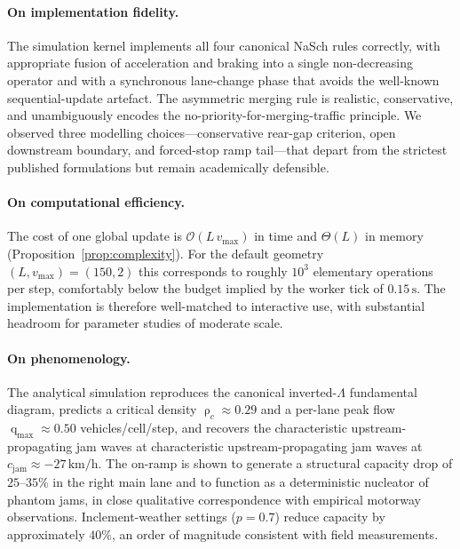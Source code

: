 \documentclass[11pt,a4paper]{article}
\DeclareMathOperator{\flow}{q}
\DeclareMathOperator{\dens}{\rho}
\begin{document}
\paragraph{On implementation fidelity.}
The simulation kernel implements all four canonical NaSch rules
correctly, with appropriate fusion of acceleration and braking into a
single non-decreasing operator and with a synchronous lane-change
phase that avoids the well-known sequential-update artefact. The
asymmetric merging rule is realistic, conservative, and unambiguously
encodes the no-priority-for-merging-traffic principle. We observed
three modelling choices---conservative rear-gap criterion, open
downstream boundary, and forced-stop ramp tail---that depart from the
strictest published formulations but remain academically defensible.

\paragraph{On computational efficiency.}
The cost of one global update is $\mathcal{O}(L\,v_{\max})$ in time and
$\Theta(L)$ in memory (Proposition~\ref{prop:complexity}). For the
default geometry $(L,v_{\max})=(150,2)$ this corresponds to roughly
$10^3$ elementary operations per step, comfortably below the budget
implied by the worker tick of $0.15\,\text{s}$. The implementation is
therefore well-matched to interactive use, with substantial headroom
for parameter studies of moderate scale.

\paragraph{On phenomenology.}
The analytical simulation reproduces the canonical inverted-$\Lambda$
fundamental diagram, predicts a critical density
$\dens_c \approx 0.29$ and a per-lane peak flow
$\flow_{\max} \approx 0.50$ vehicles/cell/step, and recovers the
characteristic upstream-propagating jam waves at
characteristic upstream-propagating jam waves at
$c_{\text{jam}} \approx -27\,\text{km/h}$. The on-ramp is shown to
generate a structural capacity drop of $25\text{--}35\%$ in the right
main lane and to function as a deterministic nucleator of phantom
jams, in close qualitative correspondence with empirical motorway
observations. Inclement-weather settings ($p=0.7$) reduce capacity by
approximately $40\%$, an order of magnitude consistent with field
measurements.
\end{document}
